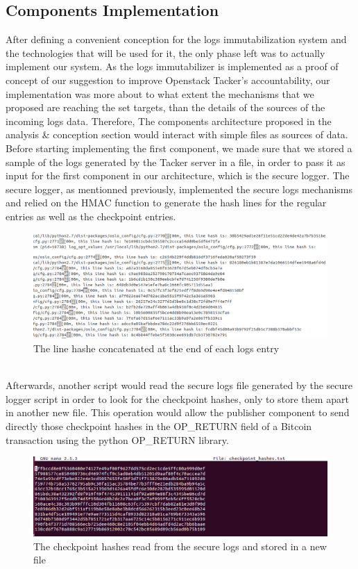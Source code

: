 \subsection{Components Implementation}
After defining a convenient conception for the logs immutabilization system and the technologies that will be used for it, the only phase left was to actually implement our system. As the logs immutabilizer is implemented as a proof of concept of our suggestion to improve Openstack Tacker's accountability, our implementation was more about to what extent the mechanisms that we proposed are reaching the set targets, than the details of the sources of the incoming logs data. Therefore, The components architecture proposed in the analysis \& conception section would interact with simple files as sources of data.\\
Before starting implementing the first component, we made sure that we stored a sample of the logs generated by the Tacker server in a file, in order to pass it as input for the first component in our architecture, which is the secure logger. The secure logger, as mentionned previously, implemented the secure logs mechanisms and relied on the HMAC function to generate the hash lines for the regular entries as well as the checkpoint entries. 
\begin{figure}[htp]
    \centering
    \includegraphics[scale=0.42]{secure}
    \caption{The line hashe concatenated at the end of each logs entry}
\end{figure}
\\
Afterwards, another script would read the secure logs file generated by the secure logger script in order to look for the checkpoint hashes, only to store them apart in another new file. This operation would allow the publisher component to send directly those checkpoint hashes in the OP\_RETURN field of a Bitcoin transaction using the python OP\_RETURN library.
\begin{figure}[htp]
    \centering
    \includegraphics[scale=0.42]{secure1}
    \caption{The checkpoint hashes read from the secure logs and stored in a new file}
\end{figure}
